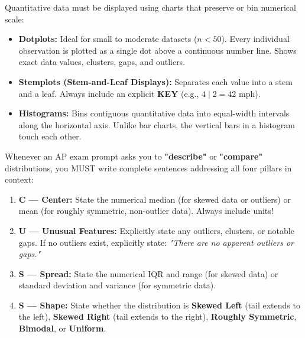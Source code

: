 \begin{lessonbox}
Quantitative data must be displayed using charts that preserve or bin numerical scale:
\begin{itemize}[leftmargin=1.2em]
  \item \textbf{Dotplots:} Ideal for small to moderate datasets ($n < 50$). Every individual observation is plotted as a single dot above a continuous number line. Shows exact data values, clusters, gaps, and outliers.
  \item \textbf{Stemplots (Stem-and-Leaf Displays):} Separates each value into a stem and a leaf. Always include an explicit \textbf{KEY} (e.g., $4 \mid 2 = 42\text{ mph}$).
  \item \textbf{Histograms:} Bins contiguous quantitative data into equal-width intervals along the horizontal axis. Unlike bar charts, the vertical bars in a histogram touch each other.
\end{itemize}
\end{lessonbox}

\begin{lessonbox}
Whenever an AP exam prompt asks you to \textbf{"describe"} or \textbf{"compare"} distributions, you MUST write complete sentences addressing all four pillars in context:
\begin{enumerate}[leftmargin=1.5em]
  \item \textbf{C --- Center:} State the numerical median (for skewed data or outliers) or mean (for roughly symmetric, non-outlier data). Always include units!
  \item \textbf{U --- Unusual Features:} Explicitly state any outliers, clusters, or notable gaps. If no outliers exist, explicitly state: \textit{"There are no apparent outliers or gaps."}
  \item \textbf{S --- Spread:} State the numerical IQR and range (for skewed data) or standard deviation and variance (for symmetric data).
  \item \textbf{S --- Shape:} State whether the distribution is \textbf{Skewed Left} (tail extends to the left), \textbf{Skewed Right} (tail extends to the right), \textbf{Roughly Symmetric}, \textbf{Bimodal}, or \textbf{Uniform}.
\end{enumerate}
\end{lessonbox}

